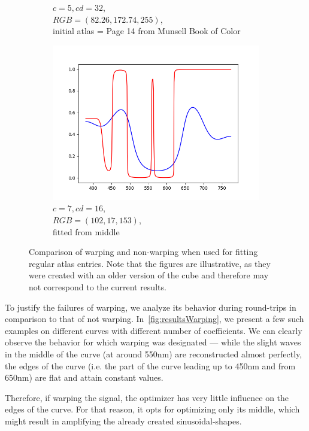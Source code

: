 \begin{figure}[t]
\begin{subfigure}[t]{0.31\textwidth}
		\caption{$c=5, cd=32$,\\$RGB=(82.26, 172.74, 255)$,\\initial atlas = Page 14 from Munsell Book of Color}
		\label{fig:warping_regularPoints_m5_cd32}
	\end{subfigure}
	\begin{subfigure}[t]{0.31\textwidth}
		\includegraphics[width=\linewidth]{img/resultsTechniqueOpt_m7_cd16.png}
		\caption{$c=7, cd=16$,\\$RGB=(102, 17, 153)$,\\ fitted from middle}
		\label{fig:warping_regularPoints_m7_cd16}
	\end{subfigure} 
	\caption{Comparison of warping and non-warping when used for fitting regular atlas entries. Note that the figures are illustrative, as they were created with an older version of the cube and therefore may not correspond to the current results.}
	\label{fig:warping_regularPoints}
\end{figure}

To justify the failures of warping, we analyze its behavior during round-trips in comparison to that of not warping. In~\cref{fig:resultsWarping}, we present a few such examples on different curves with different number of coefficients. We can clearly observe the behavior for which warping was designated --- while the slight waves in the middle of the curve (at around 550nm) are reconstructed almost perfectly, the edges of the curve (i.e. the part of the curve leading up to 450nm and from 650nm) are flat and attain constant values.

Therefore, if warping the signal, the optimizer has very little influence on the edges of the curve. For that reason, it opts for optimizing only its middle, which might result in amplifying the already created sinusoidal-shapes.

